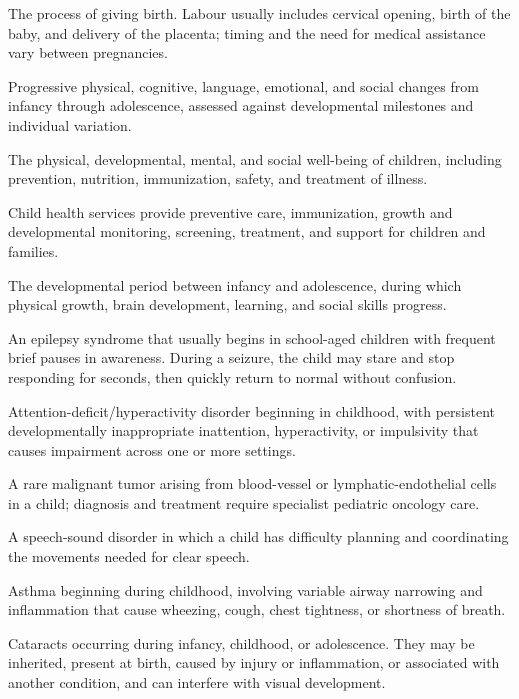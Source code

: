  The process of giving birth. Labour usually includes cervical opening, birth of the baby, and delivery of the placenta; timing and the need for medical assistance vary between pregnancies.

 Progressive physical, cognitive, language, emotional, and social changes from infancy through adolescence, assessed against developmental milestones and individual variation.

 The physical, developmental, mental, and social well-being of children, including prevention, nutrition, immunization, safety, and treatment of illness.

 Child health services provide preventive care, immunization, growth and developmental monitoring, screening, treatment, and support for children and families.

 The developmental period between infancy and adolescence, during which physical growth, brain development, learning, and social skills progress.

 An epilepsy syndrome that usually begins in school-aged children with frequent brief pauses in awareness. During a seizure, the child may stare and stop responding for seconds, then quickly return to normal without confusion.

 Attention-deficit/hyperactivity disorder beginning in childhood, with persistent developmentally inappropriate inattention, hyperactivity, or impulsivity that causes impairment across one or more settings.

 A rare malignant tumor arising from blood-vessel or lymphatic-endothelial cells in a child; diagnosis and treatment require specialist pediatric oncology care.

 A speech-sound disorder in which a child has difficulty planning and coordinating the movements needed for clear speech.

 Asthma beginning during childhood, involving variable airway narrowing and inflammation that cause wheezing, cough, chest tightness, or shortness of breath.

 Cataracts occurring during infancy, childhood, or adolescence. They may be inherited, present at birth, caused by injury or inflammation, or associated with another condition, and can interfere with visual development.

